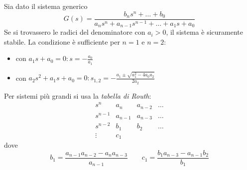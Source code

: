 \begin{esempio}
Sia dato il sistema generico
\[
	G(s) = \frac{b_n s^n + \dots + b_0}{a_n s^n + a_{n-1}s^{n-1} + \dots + a_1 s + a_0}
\]
Se si trovassero le radici del denominatore con \(a_i > 0\), il sistema è
sicuramente stabile.
La condizione è sufficiente per \(n=1\) e \(n=2\):
\begin{itemize}
	\item con \(a_1 s + a_0 = 0 \colon s = -\frac{a_0}{a_1}\)
	\item con \(a_2 s^2 + a_1 s + a_0 = 0 \colon s_{1,2} = -\frac{a_1 \pm \sqrt{a^2_1 -4a_0 a_2}}{2a_2}\)
\end{itemize}
Per sistemi più grandi si usa la \emph{tabella di Routh}:
\[\begin{array}{r|rrr}
	s^n 	& a_n 	  & a_{n-2} & \dots	\\
	s^{n-1} & a_{n-1} & a_{n-3} & \dots 	\\
	s^{n-2} & b_1 	  & b_2     & \dots 	\\
	\vdots 	& c_1
\end{array}\]
dove
\[
	b_1 = \frac{a_{n-1} a_{n-2} - a_n a_{n-3}}{a_{n-1}} \qquad
	c_1 = \frac{b_1 a_{n-3} - a_{n-1}b_2}{b_1}
\]

\end{esempio}

